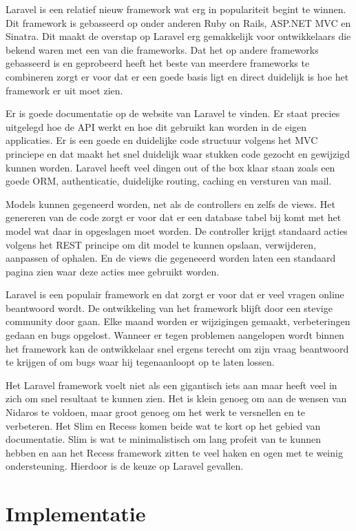 \documentclass[a4paper,11pt,oneside]{report}
\begin{document}
Laravel is een relatief nieuw framework wat erg in populariteit begint te
winnen. Dit framework is gebasseerd op onder anderen Ruby on Rails, ASP.NET MVC
en Sinatra. Dit maakt de overstap op Laravel erg gemakkelijk voor ontwikkelaars
die bekend waren met een van die frameworks. Dat het op andere frameworks
gebasseerd is en geprobeerd heeft het beste van meerdere frameworks te
combineren zorgt er voor dat er een goede basis ligt en direct duidelijk is hoe
het framework er uit moet zien.


Er is goede documentatie op de website van Laravel te vinden. Er staat precies
uitgelegd hoe de API werkt en hoe dit gebruikt kan worden in de eigen
applicaties. Er is een goede en duidelijke code structuur volgens het MVC
princiepe en dat maakt het snel duidelijk waar stukken code gezocht en gewijzigd
kunnen worden. Laravel heeft veel dingen out of the box klaar staan zoals een
goede ORM, authenticatie, duidelijke routing, caching en versturen van mail.

Models kunnen gegeneerd worden, net als de controllers en zelfs de views. Het
genereren van de code zorgt er voor dat er een database tabel bij komt met het
model wat daar in opgeslagen moet worden. De controller krijgt standaard acties
volgens het REST principe om dit model te kunnen opslaan, verwijderen, aanpassen
of ophalen. En de views die gegeneeerd worden laten een standaard pagina zien
waar deze acties mee gebruikt worden.

Laravel is een populair framework en dat zorgt er voor dat er veel vragen online
beantwoord wordt. De ontwikkeling van het framework blijft door een stevige
community door gaan. Elke maand worden er wijzigingen gemaakt, verbeteringen
gedaan en bugs opgelost. Wanneer er tegen problemen aangelopen wordt binnen het
framework kan de ontwikkelaar snel ergens terecht om zijn vraag beantwoord te
krijgen of om bugs waar hij tegenaanloopt op te laten lossen.

Het Laravel framework voelt niet als een gigantisch iets aan maar heeft veel in
zich om snel resultaat te kunnen zien. Het is klein genoeg om aan de wensen van
Nidaros te voldoen, maar groot genoeg om het werk te versnellen en te
verbeteren. Het Slim en Recess komen beide wat te kort op het gebied van
documentatie. Slim is wat te minimalistisch om lang profeit van te kunnen hebben
en aan het Recess framework zitten te veel haken en ogen met te weinig
ondersteuning. Hierdoor is de keuze op Laravel gevallen.


\chapter{Implementatie}
\end{document}
